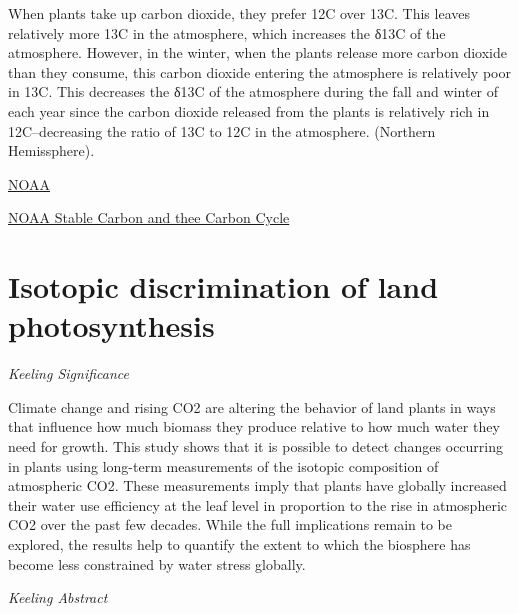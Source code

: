\documentclass[
]{book}
\begin{document}
When plants take up carbon dioxide, they prefer 12C over 13C. This leaves relatively more 13C in the atmosphere, which increases the δ13C of the atmosphere. However, in the winter, when the plants release more carbon dioxide than they consume, this carbon dioxide entering the atmosphere is relatively poor in 13C. This decreases the δ13C of the atmosphere during the fall and winter of each year since the carbon dioxide released from the plants is relatively rich in 12C--decreasing the ratio of 13C to 12C in the atmosphere. (Northern Hemissphere).

\href{https://gml.noaa.gov/education/isotopes/c14tellsus.html}{NOAA}

\href{https://gml.noaa.gov/education/isotopes/stable.html}{NOAA Stable Carbon and thee Carbon Cycle}

\hypertarget{isotopic-discrimination-of-land-photosynthesis}{%
\section{Isotopic discrimination of land photosynthesis}\label{isotopic-discrimination-of-land-photosynthesis}}

\emph{Keeling Significance}

Climate change and rising CO2 are altering the behavior of land plants in ways that influence how much biomass they produce relative to how much water they need for growth. This study shows that it is possible to detect changes occurring in plants using long-term measurements of the isotopic composition of atmospheric CO2. These measurements imply that plants have globally increased their water use efficiency at the leaf level in proportion to the rise in atmospheric CO2 over the past few decades. While the full implications remain to be explored, the results help to quantify the extent to which the biosphere has become less constrained by water stress globally.

\emph{Keeling Abstract}
\end{document}
